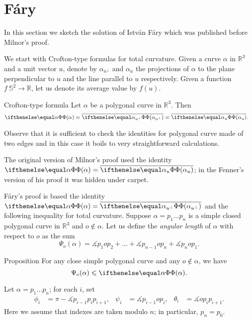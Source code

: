 \section{F\'ary}\label{sec:fary}

In this section we sketch the solution of Istv\'an F\'ary \cite{fary} which was published before Milnor's proof.

We start with Crofton-type formulas for total curvature.
Given a curve $\alpha$ in $\mathbb{R}^3$ and a unit vector $u$, denote by $\alpha_{u^\perp}$ 
and $\alpha_u$ the projections of $\alpha$ to the plane perpendicular to $u$ and the line parallel to $u$ respectively.
Given a function $f\:\mathbb{S}^2\to\mathbb{R}$, let us denote its average value by $\overline{f(u)}$.

\begin{thm}{Crofton-type formula}\label{prop:tc-crofton}
Let $\alpha$ be a polygonal curve in $\mathbb{R}^3$.
Then
\begin{align*}
\tc\alpha
&=\overline{\tc{\alpha_{u^\perp}}}
=\overline{\tc{\alpha_u}}.
\end{align*}
\end{thm}


Observe that it is sufficient to check the identities for polygonal curve made of two edges
and in this case it boils to very straightforward calculations.
\qeds

The original version of Milnor's proof 
used the identity $\tc\alpha=\overline{\tc{\alpha_u}}$;
in the Fenner's version of his proof it was hidden under carpet.

F\'ary's proof is based the identity $\tc\alpha=\overline{\tc{\alpha_{u^\perp}}}$ and the following inequality for total curvature.
Suppose $\alpha=p_1\dots p_n$ is a simple closed polygonal curve in $\mathbb{R}^3$ and $o\notin\alpha$.
Let us define the \emph{angular length} of $\alpha$ with respect to $o$ as the sum
\[\Psi_o(\alpha)=\measuredangle p_{1} o p_{2}+\dots+\measuredangle p_{n-1} o p_{n}+\measuredangle p_{n} o p_{1}.\]

\begin{thm}{Proposition}\label{prop:angular-length}
For any close simple polygonal curve and any $o\notin\alpha$, we have 
\[\Psi_o(\alpha)\le \tc{\alpha}.\]
\end{thm}

Let $\alpha=p_1\dots p_n$; for each $i$, set 
\begin{align*}
\phi_i&=\pi-\measuredangle p_{i-1}p_ip_{i+1},
&
\psi_i&=\measuredangle p_{i-1} o p_{i},
&
\theta_i&=\measuredangle o p_i p_{i+1}.
\end{align*}
Here we assume that indexes are taken modulo $n$; in particular, $p_{n}=p_0$.

